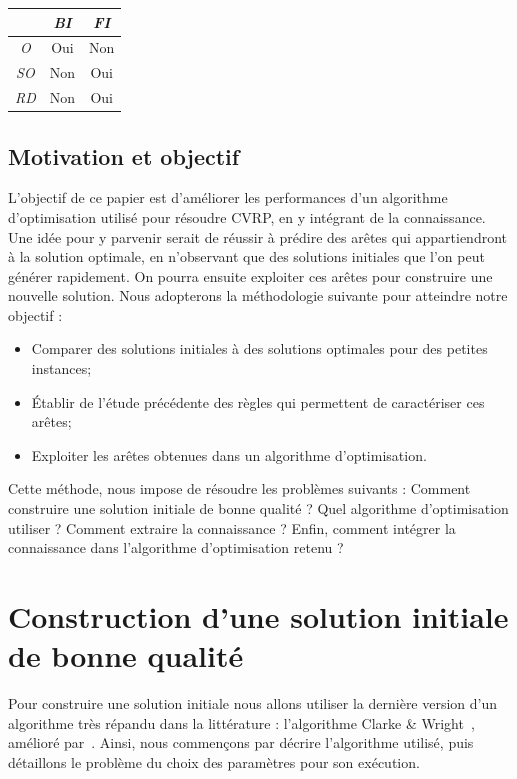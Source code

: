 \documentclass[a4paper,11pt]{article}%
\begin{document}
\begin{center}
\begin{tabular}{|c|c|c|}
   \hline
     & \emph{BI} & \emph{FI}  \\
   \hline
   \emph{O} & Oui & Non \\
   \hline
   \emph{SO} & Non & Oui \\
   \hline
   \emph{RD} & Non & Oui  \\
   \hline
\end{tabular}
\end{center}


\subsection{Motivation et objectif}

L'objectif de ce papier est d'améliorer les performances d'un algorithme d'optimisation   utilisé pour résoudre CVRP, en y intégrant de la connaissance.
Une idée pour y parvenir serait de réussir à prédire des arêtes qui appartiendront à la solution optimale, en n'observant que des solutions initiales que l'on peut générer rapidement. 
On pourra ensuite exploiter ces arêtes pour construire une nouvelle solution.
Nous adopterons la méthodologie suivante pour atteindre notre objectif :

\begin{itemize}
\item Comparer des solutions initiales à des solutions optimales pour des petites instances;
\item Établir de l'étude précédente des règles qui permettent de caractériser ces arêtes;
\item Exploiter les arêtes obtenues dans un algorithme d'optimisation.
\end{itemize}

Cette méthode, nous impose de résoudre les problèmes suivants : Comment construire une solution initiale de bonne qualité ? Quel algorithme d'optimisation utiliser ? Comment extraire la connaissance ? Enfin, comment intégrer la connaissance dans l'algorithme d'optimisation retenu ?

\section{Construction d'une solution initiale de bonne qualité}
\label{SolInit}
Pour construire une solution initiale nous allons utiliser la dernière version d'un algorithme très répandu dans la littérature : l'algorithme Clarke \& Wright~\cite{CW_1964}, amélioré par~\cite{Altinel_2005}.
Ainsi, nous commençons par décrire l'algorithme utilisé, puis détaillons le problème du choix des paramètres pour son exécution.
\end{document}
